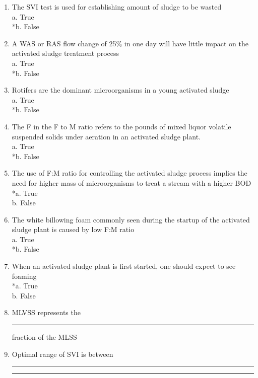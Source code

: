 \begin{enumerate}
\item  The SVI test is used for establishing amount of sludge to be wasted\\
a. True \\
*b. False \\

\item  A WAS or RAS flow change of 25\% in one day will have little impact on the activated sludge treatment process\\
a. True \\
*b. False \\

\item  Rotifers are the dominant microorganisms in a young activated sludge \\
a. True \\
*b. False \\

\item The F in the F to M ratio refers to the pounds of mixed liquor volatile suspended solids under aeration in an activated sludge plant. \\
a. True \\
*b. False \\

\item  The use of F:M ratio for controlling the activated sludge process implies the need for higher mass of microorganisms to treat a stream with a higher BOD \\
*a. True \\
b. False \\

\item  The white billowing foam commonly seen during the startup of the activated sludge plant is caused by low F:M ratio \\
a. True \\
*b. False \\

\item  When an activated sludge plant is first started, one should expect to see foaming \\
*a. True \\
b. False \\

\item MLVSS represents the \rule{1.5cm}{0.3mm}  fraction of the MLSS \\

\item Optimal range of SVI is between \rule{1.5cm}{0.3mm} \rule{1.5cm}{0.3mm} \\


\end{enumerate}
